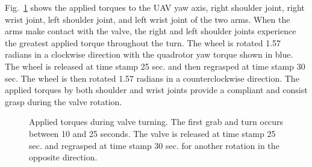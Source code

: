 Fig.~\ref{fig:plot1} shows the applied torques to the UAV yaw axis, right shoulder joint, right wrist joint, left shoulder joint, and left wrist joint of the two arms. When the arms make contact with the valve, the right and left shoulder joints experience the greatest applied torque throughout the turn. The wheel is rotated 1.57 radians in a clockwise direction with the quadrotor yaw torque shown in blue. The wheel is released at time stamp 25 sec. and then regrasped at time stamp 30 sec. The wheel is then rotated 1.57 radians in a counterclockwise direction. The applied torques by both shoulder and wrist joints provide a compliant and consist grasp during the valve rotation.

\begin{figure}
	\centering
      	{
	\vfil
      	}
	\caption{Applied torques during valve turning. The first grab and turn occurs between 10 and 25 seconds. The valve is released at time stamp 25 sec. and regrasped at time stamp 30 sec. for another rotation in the opposite direction.}
	\label{fig:plot1}
\end{figure}




